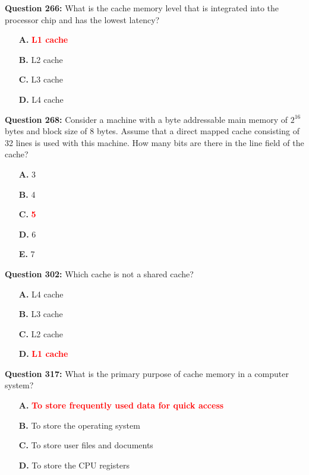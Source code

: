 \documentclass[12pt,a4paper]{article}
\begin{document}
\vspace{0.5cm}

\textbf{Question 266:} What is the cache memory level that is integrated into the processor chip and has the lowest latency?

\begin{itemize}
    \item[\textbf{A.}] \textcolor{red}{\textbf{L1 cache}}
    \item[\textbf{B.}] L2 cache
    \item[\textbf{C.}] L3 cache
    \item[\textbf{D.}] L4 cache
\end{itemize}

\vspace{0.5cm}

\textbf{Question 268:} Consider a machine with a byte addressable main memory of $2^{16}$ bytes and block size of 8 bytes. Assume that a direct mapped cache consisting of 32 lines is used with this machine. How many bits are there in the line field of the cache?

\begin{itemize}
    \item[\textbf{A.}] 3
    \item[\textbf{B.}] 4
    \item[\textbf{C.}] \textcolor{red}{\textbf{5}}
    \item[\textbf{D.}] 6
    \item[\textbf{E.}] 7
\end{itemize}

\vspace{0.5cm}

\textbf{Question 302:} Which cache is not a shared cache?

\begin{itemize}
    \item[\textbf{A.}] L4 cache
    \item[\textbf{B.}] L3 cache
    \item[\textbf{C.}] L2 cache
    \item[\textbf{D.}] \textcolor{red}{\textbf{L1 cache}}
\end{itemize}

\vspace{0.5cm}

\textbf{Question 317:} What is the primary purpose of cache memory in a computer system?

\begin{itemize}
    \item[\textbf{A.}] \textcolor{red}{\textbf{To store frequently used data for quick access}}
    \item[\textbf{B.}] To store the operating system
    \item[\textbf{C.}] To store user files and documents
    \item[\textbf{D.}] To store the CPU registers
\end{itemize}
\end{document}
